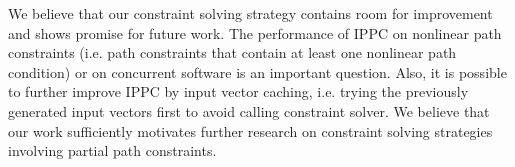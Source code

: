 \documentclass[EPiCempty]{easychair}
\begin{document}
We believe that our constraint solving strategy contains room for improvement and shows promise for future work. The performance of IPPC on nonlinear path constraints (i.e. path constraints that contain at least one nonlinear path condition) or on concurrent software is an important question. Also, it is possible to further improve IPPC by input vector caching, i.e. trying the previously generated input vectors first to avoid calling constraint solver. We believe that our work sufficiently motivates further research on constraint solving strategies involving partial path constraints.



\end{document}
